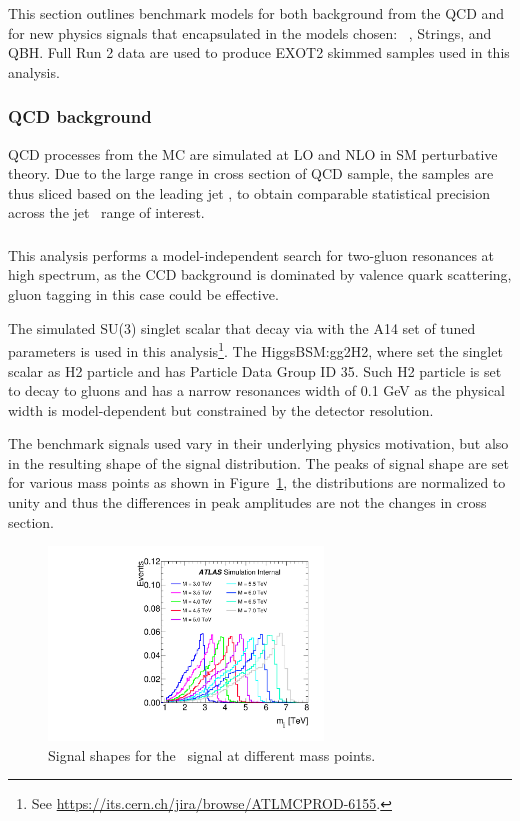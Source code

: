 This section outlines benchmark models for both background from the QCD and for new
physics signals that encapsulated in the models chosen:
\Hprime\ , Strings, and QBH.
Full Run 2 data are used to produce EXOT2 skimmed samples used in this analysis.

\subsubsection{QCD background}
\label{qcdsamps}

QCD processes from the MC are simulated at LO and NLO in SM perturbative theory. Due to the large range in cross section of QCD sample, the samples are thus sliced based on the leading jet \pt,  to obtain comparable statistical precision across the jet \pt~range of interest.



\subsubsection{\Hprime}
\label{sec:hprime}

This analysis performs a model-independent search for two-gluon resonances at high \mjj spectrum, as the CCD background is dominated by valence quark scattering, gluon tagging in this case could be effective. 

The simulated SU(3) singlet scalar that decay via  with the A14 set of tuned 
parameters is used in this analysis\footnote{See \url{https://its.cern.ch/jira/browse/ATLMCPROD-6155}.}. The HiggsBSM:gg2H2, where set the singlet scalar as H2 particle and has Particle Data Group ID 35. Such H2 particle is set to decay to gluons and has a narrow resonances width of 0.1 GeV as the physical width is 
model-dependent but constrained by the detector resolution.

The benchmark signals used vary in their underlying physics motivation, but also in the resulting shape of the signal \mjj distribution. The peaks of signal shape are set for various mass points as shown in Figure~\ref{fig:shape_Hprime}, the distributions are normalized to unity and thus the differences in peak amplitudes are not the changes in cross section.

\begin{figure}[htb]
\centering
\includegraphics[width=0.65\textwidth]{fig/benchmark_signals/SignalShape-Hprime.pdf}
\caption{Signal shapes for the \Hprime~signal at different mass points.}
\label{fig:shape_Hprime}
\end{figure}
\FloatBarrier

